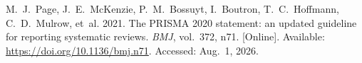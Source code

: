 \documentclass[12pt,a4paper]{report}
\begin{document}
{\begin{enumerate}[label={[\arabic*]}]


\item M.~J.~Page, J.~E.~McKenzie, P.~M.~Bossuyt, I.~Boutron, T.~C.~Hoffmann, C.~D.~Mulrow, et~al. 2021. The PRISMA 2020 statement: an updated guideline for reporting systematic reviews. \emph{BMJ}, vol.~372, n71. [Online]. Available: \url{https://doi.org/10.1136/bmj.n71}. Accessed: Aug.~1, 2026.






\end{enumerate}}
\end{document}
